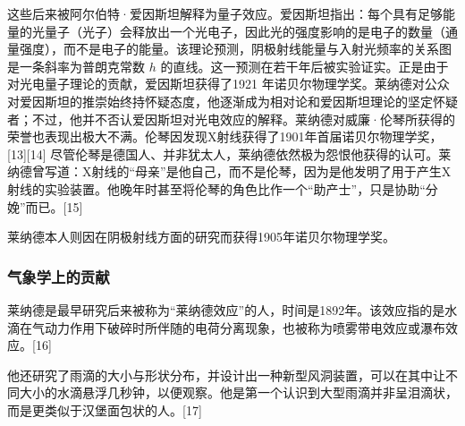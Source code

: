 这些后来被阿尔伯特·爱因斯坦解释为量子效应。爱因斯坦指出：每个具有足够能量的光量子（光子）会释放出一个光电子，因此光的强度影响的是电子的数量（通量强度），而不是电子的能量。该理论预测，阴极射线能量与入射光频率的关系图是一条斜率为普朗克常数 $h$ 的直线。这一预测在若干年后被实验证实。正是由于对光电量子理论的贡献，爱因斯坦获得了1921 年诺贝尔物理学奖。莱纳德对公众对爱因斯坦的推崇始终持怀疑态度，他逐渐成为相对论和爱因斯坦理论的坚定怀疑者；不过，他并不否认爱因斯坦对光电效应的解释。莱纳德对威廉·伦琴所获得的荣誉也表现出极大不满。伦琴因发现X射线获得了1901年首届诺贝尔物理学奖，[13][14] 尽管伦琴是德国人、并非犹太人，莱纳德依然极为怨恨他获得的认可。莱纳德曾写道：X射线的“母亲”是他自己，而不是伦琴，因为是他发明了用于产生X射线的实验装置。他晚年时甚至将伦琴的角色比作一个“助产士”，只是协助“分娩”而已。[15]

莱纳德本人则因在阴极射线方面的研究而获得1905年诺贝尔物理学奖。
\subsubsection{气象学上的贡献}
莱纳德是最早研究后来被称为“莱纳德效应”的人，时间是1892年。该效应指的是水滴在气动力作用下破碎时所伴随的电荷分离现象，也被称为喷雾带电效应或瀑布效应。[16]

他还研究了雨滴的大小与形状分布，并设计出一种新型风洞装置，可以在其中让不同大小的水滴悬浮几秒钟，以便观察。他是第一个认识到大型雨滴并非呈泪滴状，而是更类似于汉堡面包状的人。[17]
